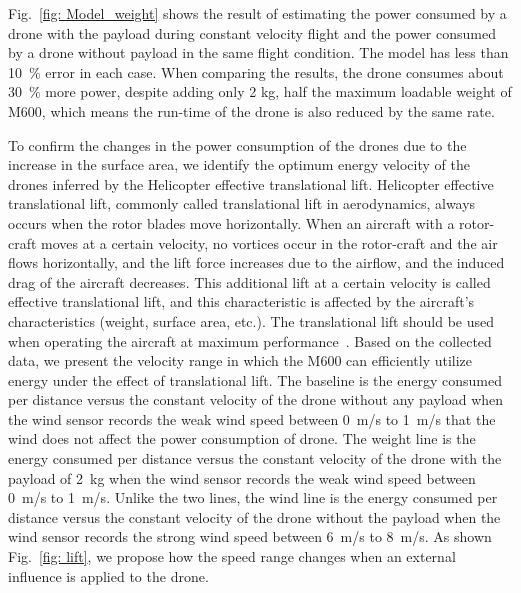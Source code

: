\documentclass[journal]{./template/IEEEtran}
\begin{document}
Fig.~\ref{fig: Model_weight} shows the result of estimating the power consumed by a drone with the payload during constant velocity flight and the power consumed by a drone without payload in the same flight condition. The model has less than 10~\% error in each case. 
When comparing the results, the drone consumes about 30~\% more power, despite adding only 2 kg, half the maximum loadable weight of M600, which means the run-time of the drone is also reduced by the same rate.

To confirm the changes in the power consumption of the drones due to the increase in the surface area, we identify the optimum energy velocity of the drones inferred by the Helicopter effective translational lift.
Helicopter effective translational lift, commonly called translational lift in aerodynamics, always occurs when the rotor blades move horizontally. When an aircraft with a rotor-craft moves at a certain velocity, no vortices occur in the rotor-craft and the air flows horizontally, and the lift force increases due to the airflow, and the induced drag of the aircraft decreases. 
This additional lift at a certain velocity is called effective translational lift, and this characteristic is affected by the aircraft's characteristics (weight, surface area, etc.). 
The translational lift should be used when operating the aircraft at maximum performance~\cite{ref_20}.
Based on the collected data, we present the velocity range in which the M600 can efficiently utilize energy under the effect of translational lift. 
The baseline is the energy consumed per distance versus the constant velocity of the drone without any payload when the wind sensor records the weak wind speed between 0~m/s to 1~m/s that the wind does not affect the power consumption of drone.
The weight line is the energy consumed per distance versus the constant velocity of the drone with the payload of 2~kg when the wind sensor records the weak wind speed between 0~m/s to 1~m/s.
Unlike the two lines, the wind line is the energy consumed per distance versus the constant velocity of the drone without the payload when the wind sensor records the strong wind speed between 6~m/s to 8~m/s. 
As shown Fig.~\ref{fig: lift}, we propose how the speed range changes when an external influence is applied to the drone.
\end{document}
